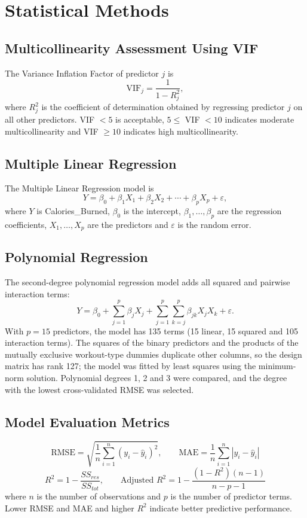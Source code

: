 \documentclass[12pt,a4paper]{report}
\begin{document}
\chapter{Statistical Methods}
\section{Multicollinearity Assessment Using VIF}
The Variance Inflation Factor of predictor $j$ is
\[ \text{VIF}_j = \frac{1}{1 - R_j^2}, \]
where $R_j^2$ is the coefficient of determination obtained by regressing predictor $j$ on all other predictors. VIF $< 5$ is acceptable, $5 \le$ VIF $< 10$ indicates moderate multicollinearity and VIF $\ge 10$ indicates high multicollinearity.

\section{Multiple Linear Regression}
The Multiple Linear Regression model is
\[ Y = \beta_0 + \beta_1 X_1 + \beta_2 X_2 + \cdots + \beta_p X_p + \varepsilon, \]
where $Y$ is Calories\_Burned, $\beta_0$ is the intercept, $\beta_1,\dots,\beta_p$ are the regression coefficients, $X_1,\dots,X_p$ are the predictors and $\varepsilon$ is the random error.

\section{Polynomial Regression}
The second-degree polynomial regression model adds all squared and pairwise interaction terms:
\[ Y = \beta_0 + \sum_{j=1}^{p}\beta_j X_j + \sum_{j=1}^{p}\sum_{k=j}^{p}\beta_{jk} X_j X_k + \varepsilon. \]
With $p = 15$ predictors, the model has 135 terms (15 linear, 15 squared and 105 interaction terms). The squares of the binary predictors and the products of the mutually exclusive workout-type dummies duplicate other columns, so the design matrix has rank 127; the model was fitted by least squares using the minimum-norm solution. Polynomial degrees 1, 2 and 3 were compared, and the degree with the lowest cross-validated RMSE was selected.

\section{Model Evaluation Metrics}
\[ \text{RMSE} = \sqrt{\frac{1}{n}\sum_{i=1}^{n}(y_i-\hat y_i)^2}, \qquad \text{MAE} = \frac{1}{n}\sum_{i=1}^{n}|y_i-\hat y_i| \]
\[ R^2 = 1 - \frac{SS_{res}}{SS_{tot}}, \qquad \text{Adjusted } R^2 = 1 - \frac{(1-R^2)(n-1)}{n-p-1} \]
where $n$ is the number of observations and $p$ is the number of predictor terms. Lower RMSE and MAE and higher $R^2$ indicate better predictive performance.
\end{document}
